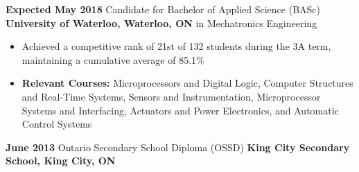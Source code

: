 \documentclass[hidelinks]{kkurucz-cv}
\begin{document}
\begin{entrylist}
\entry
{\textbf{Expected May 2018}}
{Candidate for Bachelor of Applied Science (BASc)}
{\textbf{University of Waterloo, Waterloo, ON}}
{{\headingfont in Mechatronics Engineering}}
{
\begin{itemize}
\item Achieved a competitive rank of 21st of 132 students during the 3A term, maintaining a cumulative average of 85.1\%
\item \textbf{Relevant Courses:}  Microprocessors and Digital Logic, Computer Structures and Real-Time Systems, Sensors and Instrumentation, Microprocessor Systems and Interfacing, Actuators and Power Electronics, and Automatic Control Systems
\end{itemize}
}
\entry
{\textbf{June 2013}}
{Ontario Secondary School Diploma (OSSD)}
{\textbf{King City Secondary School, King City, ON}}
{\null}
{\null}
\end{entrylist}
\end{document}
